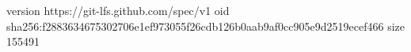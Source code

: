 version https://git-lfs.github.com/spec/v1
oid sha256:f2883634675302706e1ef973055f26cdb126b0aab9af0cc905e9d2519ecef466
size 155491
